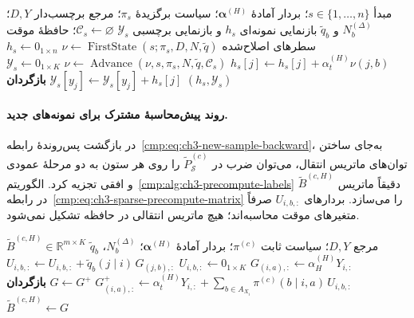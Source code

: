 \begin{algorithm}[!htbp]
\caption{روند $\operatorname{ExactWalkExpectation}$: امید دقیق گشت آموزشی روی گراف انتخاب‌شده}
\label{cmp:alg:ch3-exact-walk-expectation}
\begin{algorithmic}[1]
\REQUIRE مبدأ $s\in\{1,\ldots,n\}$؛
بردار آمادهٔ $\boldsymbol\alpha^{(H)}$؛ سیاست برگزیدهٔ $\pi_s$؛
مرجع برچسب‌دار $D,Y$؛
$N_b^{(\Delta)}$ و $\widetilde q_b$
\ENSURE بازنمایی نمونه‌ای $h_s$
و بازنمایی برچسبی $\mathscr Y_s$
\STATE $\mathcal C_s\gets\varnothing$؛ حافظهٔ موقت سطرهای اصلاح‌شده
\STATE $\nu\gets
\operatorname{FirstState}(s;\pi_s,D,N,\widetilde q)$
\STATE $h_s\gets0_{1\times n}$
        \STATE $h_s[j]\gets
        h_s[j]+\alpha_t^{(H)}\nu(j,b)$
    \ENDFOR
        \STATE $\nu\gets
        \operatorname{Advance}(\nu,s,\pi_s,N,\widetilde q,\mathcal C_s)$
    \ENDIF
\ENDFOR
\STATE $\mathscr Y_s\gets0_{1\times K}$
    \STATE $\mathscr Y_s[y_j]\gets\mathscr Y_s[y_j]+h_s[j]$
\ENDFOR
\STATE \textbf{بازگردان} $(h_s,\mathscr Y_s)$
\end{algorithmic}
\end{algorithm}

\paragraph{روند پیش‌محاسبهٔ مشترک برای نمونه‌های جدید.}
در بازگشت پس‌روندهٔ
رابطه~\eqref{cmp:eq:ch3-new-sample-backward}،
به‌جای ساختن توان‌های ماتریس
انتقال، می‌توان ضرب در
$\widetilde P_{\mathcal S}^{(c)}$
را روی هر ستون به دو مرحلهٔ
عمودی و افقی تجزیه کرد.
الگوریتم~\ref{cmp:alg:ch3-precompute-labels}
دقیقاً ماتریس
$\widetilde B^{(c,H)}$ در
رابطه~\eqref{cmp:eq:ch3-sparse-precompute-matrix}
را می‌سازد. بردارهای $U_{i,b,:}$
صرفاً متغیرهای موقت محاسبه‌اند؛
هیچ ماتریس انتقالی در حافظه
تشکیل نمی‌شود.

\begin{algorithm}[!htbp]
\caption{روند $\operatorname{PrecomputeLabels}$: بازگشت پس‌روندهٔ مشترک}
\label{cmp:alg:ch3-precompute-labels}
\begin{algorithmic}[1]
\REQUIRE مرجع $D,Y$؛ سیاست ثابت $\pi^{(c)}$؛
بردار آمادهٔ $\boldsymbol\alpha^{(H)}$؛ $N_b^{(\Delta)}$، $\widetilde q_b$
\ENSURE $\widetilde B^{(c,H)}\in\mathbb R^{m\times K}$
    \STATE $G_{(i,a),:}\gets\alpha_H^{(H)}Y_{i,:}$
\ENDFOR
{}
        \STATE $U_{i,b,:}\gets0_{1\times K}$
            \STATE $U_{i,b,:}\gets U_{i,b,:}
            +\widetilde q_b(j\mid i)\,G_{(j,b),:}$
        \ENDFOR
    \ENDFOR
        \STATE $G^+_{(i,a),:}\gets
        \alpha_t^{(H)}Y_{i,:}
        +\sum_{b\in A_{X_i}}
        \pi^{(c)}(b\mid i,a)\,U_{i,b,:}$
    \ENDFOR
    \STATE $G\gets G^+$
\ENDFOR
\STATE \textbf{بازگردان} $\widetilde B^{(c,H)}\gets G$
\end{algorithmic}
\end{algorithm}

